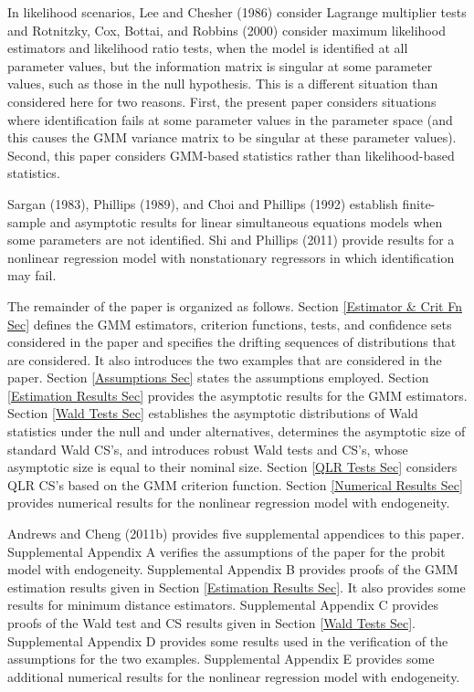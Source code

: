 \documentclass[12pt,thmsb,titlepage,final,oneside,letterpaper]{article}
\begin{document}
In likelihood scenarios, Lee and Chesher (1986) consider Lagrange multiplier
tests and Rotnitzky, Cox, Bottai, and Robbins (2000) consider maximum
likelihood estimators and likelihood ratio tests, when the model is
identified at all parameter values, but the information matrix is singular
at some parameter values, such as those in the null hypothesis. This is a
different situation than considered here for two reasons. First, the present
paper considers situations where identification fails at some parameter
values in the parameter space (and this causes the GMM variance matrix to be
singular at these parameter values). Second, this paper considers GMM-based
statistics rather than likelihood-based statistics.

Sargan (1983), Phillips (1989), and Choi and Phillips (1992) establish
finite-sample and asymptotic results for linear simultaneous equations
models when some parameters are not identified. Shi and Phillips (2011)
provide results for a nonlinear regression model with nonstationary
regressors in which identification may fail.

The remainder of the paper is organized as follows. Section \ref{Estimator &
Crit Fn Sec} defines the GMM estimators, criterion functions, tests, and
confidence sets considered in the paper and specifies the drifting sequences
of distributions that are considered. It also introduces the two examples
that are considered in the paper. Section \ref{Assumptions Sec} states the
assumptions employed. Section \ref{Estimation Results Sec} provides the
asymptotic results for the GMM estimators. Section \ref{Wald Tests Sec}
establishes the asymptotic distributions of Wald statistics under the null
and under alternatives, determines the asymptotic size of standard Wald
CS's, and introduces robust Wald tests and CS's, whose asymptotic size is
equal to their nominal size. Section \ref{QLR Tests Sec} considers QLR CS's
based on the GMM criterion function. Section \ref{Numerical Results Sec}
provides numerical results for the nonlinear regression model with
endogeneity.

Andrews and Cheng (2011b) provides five supplemental appendices to this
paper. Supplemental Appendix A verifies the assumptions of the paper for the
probit model with endogeneity. Supplemental Appendix B provides proofs of
the GMM estimation results given in Section \ref{Estimation Results Sec}. It
also provides some results for minimum distance estimators. Supplemental
Appendix C provides proofs of the Wald test and CS results given in Section %
\ref{Wald Tests Sec}. Supplemental Appendix D provides some results used in
the verification of the assumptions for the two examples. Supplemental
Appendix E provides some additional numerical results for the nonlinear
regression model with endogeneity.
\end{document}
